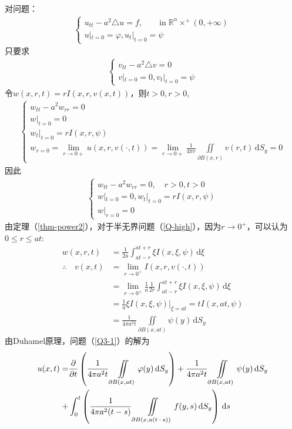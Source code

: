 \documentclass[11pt, a4paper]{article}
\theoremstyle{theorem}
\newcommand{\intd}[1]{\,\mathrm{d}{#1}}
\begin{document}
对问题：
\begin{align}
\label{Q3-1}
    \begin{cases}
    u_{tt} - a^2 \triangle u = f,   \quad \quad \text{in} \; \mathbb{R}^n \times^+ (0, +\infty) \\
    u|_{t = 0} = \varphi, u_t|_{t = 0} = \psi
    \end{cases}
\end{align}
只要求
\begin{align}
    \begin{cases}
    v_{tt} - a^2 \triangle v = 0 \\
    v|_{t = 0} = 0, v_t|_{t = 0} = \psi
    \end{cases}
\end{align}
令$w(x,r,t) = r I(x,r,v(x,t))$，则$t > 0, r > 0$,
\begin{align}
    \begin{cases}
    w_{tt} - a^2 w_{rr} = 0 \\
    w|_{t = 0} = 0 \\
    w_t|_{t = 0} = r I(x,r,\psi) \\
    w_{r = 0} = \lim\limits_{r \rightarrow 0+} u(x,r,v(\cdot,t)) = \lim\limits_{r \rightarrow 0+} \frac{1}{4 \pi r} \iint\limits_{\partial B(x,r)} v(r,t) \intd S_y = 0
    \end{cases}
\end{align}
因此
\begin{align}
\label{Q-high}
    \begin{cases}
    w_{tt} - a^2 w_{rr} = 0, \quad r > 0, t > 0 \\
    w|_{t = 0} = 0, w_t|_{t = 0} = rI(x,r,\psi) \\
    w|_{r = 0} = 0
    \end{cases}
\end{align}
由定理（\ref{thm-power2}），对于半无界问题（\ref{Q-high}），因为$r \rightarrow 0^+$，可以认为$0 \leq r \leq at$:
\begin{align*}
    w(x,r,t) &= \frac{1}{2a} \int_{at-r}^{at+r} \xi I(x,\xi, \psi) \intd \xi \\
    \therefore \quad v(x,t) &= \lim\limits_{r \rightarrow 0^+} I(x,r,v(\cdot,t)) \\
    &= \lim\limits_{r \rightarrow 0^+} \frac{1}{a} \frac{1}{2r} \int_{at-r}^{at+r} \xi I(x,\xi, \psi) \intd \xi \\
    &= \frac{1}{a} \xi I(x,\xi, \psi)\bigg|_{\xi = at} = t I(x,at,\psi) \\
    &= \frac{1}{4\pi a^2 t} \iint\limits_{\partial B(x,at)} \psi(y) \intd S_y
\end{align*}
由Duhamel原理，问题（\ref{Q3-1}）的解为
\begin{align}
\label{A3-1}
    u(x,t) = &\frac{\partial}{\partial t} \left(\frac{1}{4 \pi a^2 t} \iint\limits_{\partial B(x,at)} \varphi(y) \intd S_y\right) + \frac{1}{4 \pi a^2 t} \iint\limits_{\partial B(x,at)} \psi(y) \intd S_y \notag \\
    + &\int_0^t \left(\frac{1}{4\pi a^2(t-s)}\iint\limits_{\partial B(x,a(t-s))}f(y,s) \intd S_y \right) \intd s
\end{align}
\end{document}
